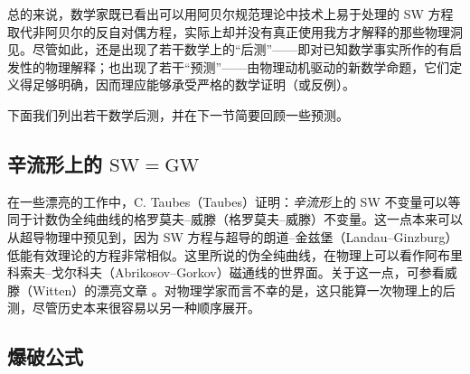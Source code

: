 总的来说，数学家既已看出可以用阿贝尔规范理论中技术上易于处理的 SW 方程取代非阿贝尔的反自对偶方程，实际上却并没有真正使用我方才解释的那些物理洞见。尽管如此，还是出现了若干数学上的“后测”——即对已知数学事实所作的有启发性的物理解释；也出现了若干“预测”——由物理动机驱动的新数学命题，它们定义得足够明确，因而理应能够承受严格的数学证明（或反例）。

下面我们列出若干数学后测，并在下一节简要回顾一些预测。

\subsection{辛流形上的 $\mathrm{SW}=\mathrm{GW}$}

在一些漂亮的工作中，C. Taubes（Taubes）证明：\emph{辛流形}上的 SW 不变量可以等同于计数伪全纯曲线的格罗莫夫--威滕（格罗莫夫--威滕）不变量。这一点本来可以从超导物理中预见到，因为 SW 方程与超导的朗道--金兹堡（Landau--Ginzburg）低能有效理论的方程非常相似。这里所说的伪全纯曲线，在物理上可以看作阿布里科索夫--戈尔科夫（Abrikosov--Gorkov）磁通线的世界面。关于这一点，可参看威滕（Witten）的漂亮文章 \cite{ref57}。对物理学家而言不幸的是，这只能算一次物理上的后测，尽管历史本来很容易以另一种顺序展开。



\subsection{爆破公式}

